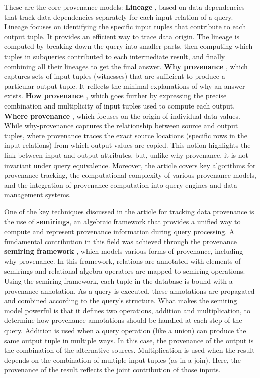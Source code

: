 \documentclass[11pt,a4paper]{article}
\begin{document}
These are the core provenance models:
\textbf{Lineage} \cite{whyAndWhereBuneman}, based on data dependencies that track data dependencies separately for each input relation of a query.  Lineage focuses on identifying the specific input tuples that contribute to each output tuple. It provides an efficient way to trace data origin. The lineage is computed by breaking down the query into smaller parts, then computing which tuples in subqueries contributed to each intermediate result, and finally combining all their lineages to get the final answer.
\textbf{Why provenance} \cite{whyAndWhereBuneman}, which captures sets of input tuples (witnesses) that are sufficient to produce a particular output tuple. It reflects the minimal explanations of why an answer exists.
\textbf{How provenance} \cite{whyHowWhereprovenance}, which goes further by expressing the precise combination and multiplicity of input tuples used to compute each output.
\textbf{Where provenance} \cite{whyAndWhereBuneman}, which focuses on the origin of individual data values. While why-provenance captures the relationship between source and output tuples, where provenance traces the exact source locations (specific rows in the input relations) from which output values are copied. This notion highlights the link between input and output attributes, but, unlike why provenance, it is not invariant under query equivalence.
Moreover, the article covers key algorithms for provenance tracking, the computational complexity of various provenance models, and the integration of provenance computation into query engines and data management systems.

One of the key techniques discussed in the article for tracking data provenance is the use of \textbf{semirings}, an algebraic framework that provides a unified way to compute and represent provenance information during query processing. A fundamental contribution in this field was achieved through the provenance \textbf{semiring framework} \cite{provenanceSemirings}, which models various forms of provenance, including why-provenance. In this framework, relations are annotated with elements of semirings and relational algebra operators are mapped to semiring operations.
Using the semiring framework, each tuple in the database is bound with a provenance annotation. As a query is executed, these annotations are propagated and combined according to the query's structure. What makes the semiring model powerful is that it defines two operations, addition and multiplication, to determine how provenance annotations should be handled at each step of the query.
Addition is used when a query operation (like a union) can produce the same output tuple in multiple ways. In this case, the provenance of the output is the combination of the alternative sources.
Multiplication is used when the result depends on the combination of multiple input tuples (as in a join). Here, the provenance of the result reflects the joint contribution of those inputs.
\end{document}
